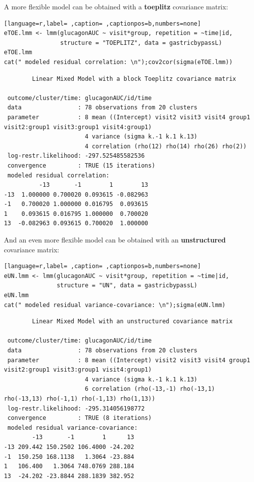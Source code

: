 \documentclass[12pt]{article}
\begin{document}
\noindent A more flexible model can be obtained with a \textbf{toeplitz} covariance matrix:
\begin{lstlisting}[language=r,label= ,caption= ,captionpos=b,numbers=none]
eTOE.lmm <- lmm(glucagonAUC ~ visit*group, repetition = ~time|id,
                structure = "TOEPLITZ", data = gastricbypassL)
eTOE.lmm
cat(" modeled residual correlation: \n");cov2cor(sigma(eTOE.lmm))
\end{lstlisting}

\begin{verbatim}
		Linear Mixed Model with a block Toeplitz covariance matrix 

 outcome/cluster/time: glucagonAUC/id/time 
 data                : 78 observations from 20 clusters 
 parameter           : 8 mean ((Intercept) visit2 visit3 visit4 group1 visit2:group1 visit3:group1 visit4:group1) 
                       4 variance (sigma k.-1 k.1 k.13) 
                       4 correlation (rho(12) rho(14) rho(26) rho(2)) 
 log-restr.likelihood: -297.525485582536 
 convergence         : TRUE (15 iterations)
 modeled residual correlation: 
          -13       -1        1        13
-13  1.000000 0.700020 0.093615 -0.082963
-1   0.700020 1.000000 0.016795  0.093615
1    0.093615 0.016795 1.000000  0.700020
13  -0.082963 0.093615 0.700020  1.000000
\end{verbatim}

\clearpage

\noindent And an even more flexible model can be obtained with an
\textbf{unstructured} covariance matrix:

\begin{lstlisting}[language=r,label= ,caption= ,captionpos=b,numbers=none]
eUN.lmm <- lmm(glucagonAUC ~ visit*group, repetition = ~time|id,
               structure = "UN", data = gastricbypassL)
eUN.lmm
cat(" modeled residual variance-covariance: \n");sigma(eUN.lmm)
\end{lstlisting}

\begin{verbatim}
		Linear Mixed Model with an unstructured covariance matrix 

 outcome/cluster/time: glucagonAUC/id/time 
 data                : 78 observations from 20 clusters 
 parameter           : 8 mean ((Intercept) visit2 visit3 visit4 group1 visit2:group1 visit3:group1 visit4:group1) 
                       4 variance (sigma k.-1 k.1 k.13) 
                       6 correlation (rho(-13,-1) rho(-13,1) rho(-13,13) rho(-1,1) rho(-1,13) rho(1,13)) 
 log-restr.likelihood: -295.314056198772 
 convergence         : TRUE (8 iterations)
 modeled residual variance-covariance: 
        -13       -1        1      13
-13 209.442 150.2502 106.4000 -24.202
-1  150.250 168.1138   1.3064 -23.884
1   106.400   1.3064 748.0769 288.184
13  -24.202 -23.8844 288.1839 382.952
\end{verbatim}
\end{document}
